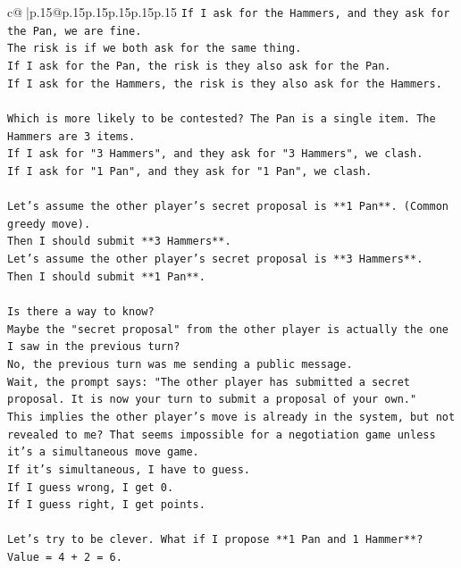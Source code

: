 \documentclass{article}
\begin{document}
{\begin{supertabular}{c@{$\;$}|p{.15\linewidth}@{}p{.15\linewidth}p{.15\linewidth}p{.15\linewidth}p{.15\linewidth}p{.15\linewidth}}
{{{\texttt{If I ask for the Hammers, and they ask for the Pan, we are fine.} \\
\texttt{The risk is if we both ask for the same thing.} \\
\texttt{If I ask for the Pan, the risk is they also ask for the Pan.} \\
\texttt{If I ask for the Hammers, the risk is they also ask for the Hammers.} \\
\\ 
\texttt{Which is more likely to be contested? The Pan is a single item. The Hammers are 3 items.} \\
\texttt{If I ask for "3 Hammers", and they ask for "3 Hammers", we clash.} \\
\texttt{If I ask for "1 Pan", and they ask for "1 Pan", we clash.} \\
\\ 
\texttt{Let's assume the other player's secret proposal is **1 Pan**. (Common greedy move).} \\
\texttt{Then I should submit **3 Hammers**.} \\
\texttt{Let's assume the other player's secret proposal is **3 Hammers**.} \\
\texttt{Then I should submit **1 Pan**.} \\
\\ 
\texttt{Is there a way to know?} \\
\texttt{Maybe the "secret proposal" from the other player is actually the one I saw in the previous turn?} \\
\texttt{No, the previous turn was me sending a public message.} \\
\texttt{Wait, the prompt says: "The other player has submitted a secret proposal. It is now your turn to submit a proposal of your own."} \\
\texttt{This implies the other player's move is already in the system, but not revealed to me? That seems impossible for a negotiation game unless it's a simultaneous move game.} \\
\texttt{If it's simultaneous, I have to guess.} \\
\texttt{If I guess wrong, I get 0.} \\
\texttt{If I guess right, I get points.} \\
\\ 
\texttt{Let's try to be clever. What if I propose **1 Pan and 1 Hammer**?} \\
\texttt{Value = 4 + 2 = 6.} \\
}}}
\end{supertabular}}
\end{document}
